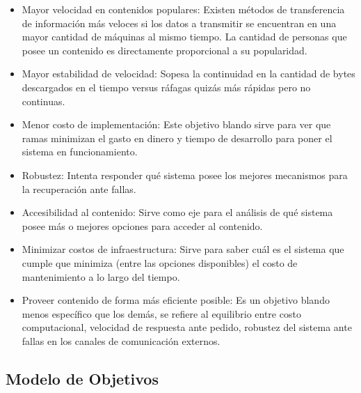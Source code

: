 \documentclass[11pt, a4paper, spanish]{article}
\begin{document}
	\begin{itemize}

	\item{ Mayor velocidad en contenidos populares: Existen m\'etodos de transferencia de informaci\'on m\'as veloces si los datos a transmitir se 	
	encuentran en una mayor cantidad de m\'aquinas al mismo tiempo. La cantidad de personas que posee un contenido es directamente proporcional a su 
	popularidad.}

	\item{ Mayor estabilidad de velocidad: Sopesa la continuidad en la cantidad de bytes descargados en el tiempo versus r\'afagas quiz\'as m\'as 
	r\'apidas pero no continuas.}

	\item{ Menor costo de implementaci\'on: Este objetivo blando sirve para ver que ramas minimizan el gasto en dinero y tiempo de desarrollo 	
	para poner el sistema en funcionamiento. }

	\item{ Robustez: Intenta responder qu\'e sistema posee los mejores mecanismos para la recuperaci\'on ante fallas.}
    
	\item{ Accesibilidad al contenido: Sirve como eje para el an\'alisis de qu\'e sistema posee m\'as o mejores opciones para acceder al contenido.}

	\item{ Minimizar costos de infraestructura: Sirve para saber cu\'al es el sistema que cumple que minimiza (entre las opciones disponibles) el 
	costo de mantenimiento a lo largo del tiempo.}

	\item{ Proveer contenido de forma m\'as eficiente posible: Es un objetivo blando menos espec\'ifico que los dem\'as, se refiere al equilibrio entre 
	costo computacional, velocidad de respuesta ante pedido, robustez del sistema ante fallas en los canales de comunicaci\'on externos.}

	\end{itemize}

\subsection{Modelo de Objetivos}
\end{document}
